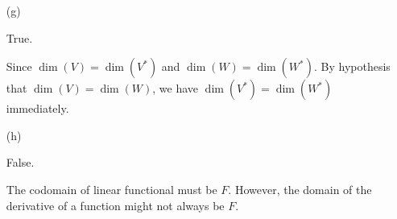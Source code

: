 \begin{Exercise}
\begin{enumerate}[(a)]
		\item[(g)]
		\begin{answer}
			True.
		\end{answer}
		\begin{solution}
			Since $\dim(V)=\dim(V^*)$ and $\dim(W)=\dim(W^*)$. By hypothesis that $\dim(V)=\dim(W)$, we have $\dim(V^*)=\dim(W^*)$ immediately.
		\end{solution}
		
		\item[(h)]
		\begin{answer}
			False.
		\end{answer}
		\begin{solution}
			The codomain of linear functional must be $F$. However, the domain of the derivative of a function might not always be $F$.
		\end{solution}
		
	\end{enumerate}
\end{Exercise}